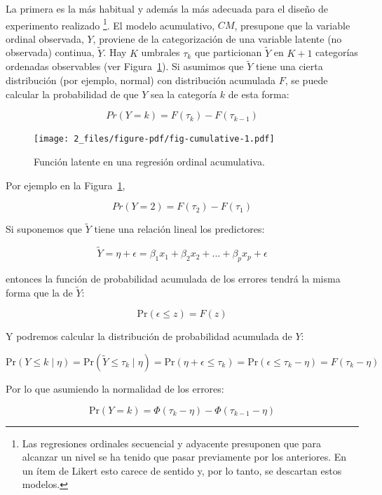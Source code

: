 \documentclass[
  12pt,
  a4paper,
  extrafontsizes,
  onecolumn,
  openright,
  table]{memoir}
\begin{document}
La primera es la más habitual y además la más adecuada para el diseño de
experimento realizado \autocite[ver][pp.~23-24]{burkner2019}
\footnote{Las regresiones ordinales secuencial y adyacente presuponen
  que para alcanzar un nivel se ha tenido que pasar previamente por los
  anteriores. En un ítem de Likert esto carece de sentido y, por lo
  tanto, se descartan estos modelos.}. El modelo acumulativo, \(CM\),
presupone que la variable ordinal observada, \(Y\), proviene de la
categorización de una variable latente (no observada) continua,
\(\tilde{Y}\). Hay \(K\) umbrales \(\tau_k\) que particionan
\(\tilde{Y}\) en \(K + 1\) categorías ordenadas observables (ver
Figura~\ref{fig-cumulative}). Si asumimos que \(\tilde{Y}\) tiene una
cierta distribución (por ejemplo, normal) con distribución acumulada
\(F\), se puede calcular la probabilidad de que \(Y\) sea la categoría
\(k\) de esta forma:

\[Pr(Y = k) = F(\tau_k) - F(\tau_{k-1})\]

\begin{figure}[h]

{\centering \texttt{[image: 2\_files/figure-pdf/fig-cumulative-1.pdf]}

}

\caption{\label{fig-cumulative}Función latente en una regresión ordinal
acumulativa.}

\end{figure}

Por ejemplo en la Figura~\ref{fig-cumulative},

\[Pr(Y = 2) = F(\tau_2) - F(\tau_{1})\]

Si suponemos que \(\tilde{Y}\) tiene una relación lineal los
predictores:

\[\tilde{Y} = \eta + \epsilon = \beta_1 x_1 + \beta_2 x_2 + ... + \beta_p x_p + \epsilon\]

entonces la función de probabilidad acumulada de los errores tendrá la
misma forma que la de \(\tilde{Y}\):

\[\mathrm{Pr}(\epsilon \leq z) = F(z)\]

Y podremos calcular la distribución de probabilidad acumulada de \(Y\):

\[\mathrm{Pr}(Y \leq k \mid \eta) = \mathrm{Pr}(\tilde{Y} \leq \tau_k \mid \eta) = \mathrm{Pr}(\eta + \epsilon \leq \tau_k) = \mathrm{Pr}(\epsilon \leq \tau_k - \eta) = F(\tau_k - \eta)\]

Por lo que asumiendo la normalidad de los errores:

\[\mathrm{Pr}(Y = k) = \Phi(\tau_k - \eta) - \Phi(\tau_{k - 1} - \eta)\]
\end{document}
